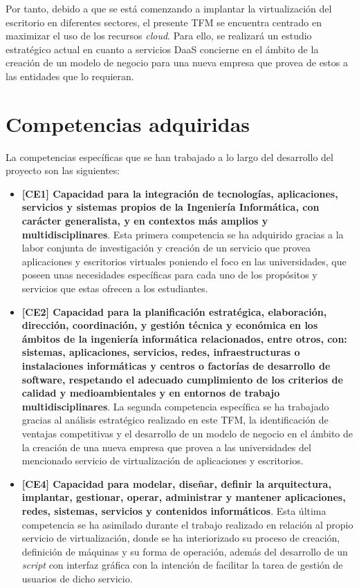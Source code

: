 Por tanto, debido a que se está comenzando a implantar la virtualización del escritorio en diferentes sectores, el presente \acf{TFM} se encuentra centrado en maximizar el uso de los recursos \textit{cloud}. Para ello, se realizará un estudio estratégico actual en cuanto a servicios \acs{DaaS} concierne en el ámbito de la creación de un modelo de negocio para una nueva empresa que provea de estos a las entidades que lo requieran.

\clearpage

\section{Competencias adquiridas}
La competencias específicas que se han trabajado a lo largo del desarrollo del proyecto son las siguientes:

\begin{itemize}
    \item \textbf{[CE1] Capacidad para la integración de tecnologías, aplicaciones, servicios y sistemas propios de la Ingeniería Informática, con carácter generalista, y en contextos más amplios y multidisciplinares}. Esta primera competencia se ha adquirido gracias a la labor conjunta de investigación y creación de un servicio que provea aplicaciones y escritorios virtuales poniendo el foco en las universidades, que poseen unas necesidades específicas para cada uno de los propósitos y servicios que estas ofrecen a los estudiantes.
    
    \item \textbf{[CE2] Capacidad para la planificación estratégica, elaboración, dirección, coordinación, y gestión técnica y económica en los ámbitos de la ingeniería informática relacionados, entre otros, con: sistemas, aplicaciones, servicios, redes, infraestructuras o instalaciones informáticas y centros o factorías de desarrollo de software, respetando el adecuado cumplimiento de los criterios de calidad y medioambientales y en entornos de trabajo multidisciplinares}. La segunda competencia específica se ha trabajado gracias al análisis estratégico realizado en este \acs{TFM}, la identificación de ventajas competitivas y el desarrollo de un modelo de negocio en el ámbito de la creación de una nueva empresa que provea a las universidades del mencionado servicio de virtualización de aplicaciones y escritorios.
    
    \item \textbf{[CE4] Capacidad para modelar, diseñar, definir la arquitectura, implantar, gestionar, operar, administrar y mantener aplicaciones, redes, sistemas, servicios y contenidos informáticos}. Esta última competencia se ha asimilado durante el trabajo realizado en relación al propio servicio de virtualización, donde se ha interiorizado su proceso de creación, definición de máquinas y su forma de operación, además del desarrollo de un \textit{script} con interfaz gráfica con la intención de facilitar la tarea de gestión de usuarios de dicho servicio.
\end{itemize}

